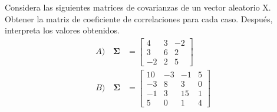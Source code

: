 \documentclass[12pt]{article}
\newenvironment{problem}[2][Problema]{\begin{trivlist}
\item[\hskip \labelsep {\bfseries #1}\hskip \labelsep {\bfseries #2.}]}{\end{trivlist}}
\begin{document}

\begin{problem}{1}
Considera las siguientes matrices de covarianzas de un vector aleatorio X. Obtener la matriz de coeficiente de correlaciones para cada caso. Después, interpreta los valores obtenidos.
\begin{align*}
A) \quad \mathbf{\Sigma} &=
\begin{bmatrix}
4&3&-2\\
3&6&2\\
-2&2&5
\end{bmatrix}\\
B) \quad \mathbf{\Sigma} &=
\begin{bmatrix}
10&-3&-1&5\\
-3&8&3&0\\
-1&3&15&1\\
5&0&1&4
\end{bmatrix}
\end{align*}

\end{problem}
\end{document}
